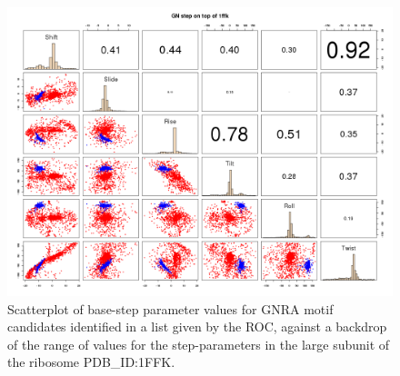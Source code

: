 \begin{figure}
\centering 
\includegraphics[angle=90, scale=0.5]{Chapter5/GNRAin1ffk.png}
\caption{Scatterplot  of  base-step parameter  values  for GNRA  motif
  candidates identified in a list given by the ROC, against a backdrop
  of the range of values  for the step-parameters in the large subunit
  of the ribosome PDB\_ID:1FFK.}
\label{fig:scattergnra}
\end{figure}



